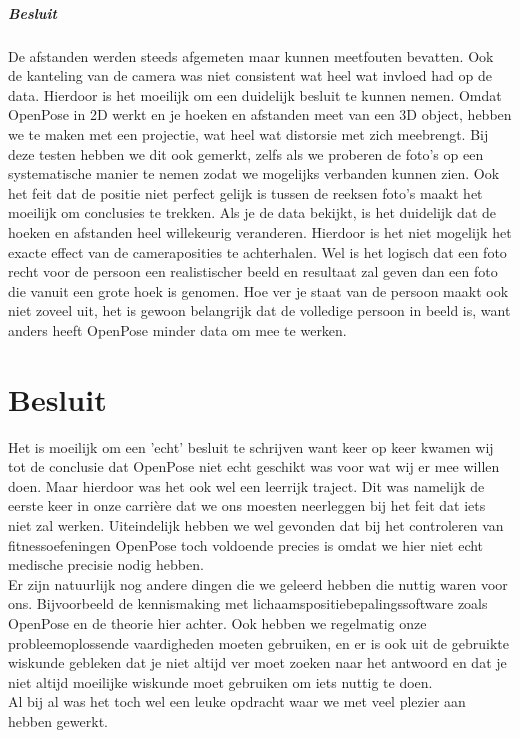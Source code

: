 \documentclass[a4paper,twoside,kulak]{kulakreport}
\begin{document}
\paragraph{Besluit}
De afstanden werden steeds afgemeten maar kunnen meetfouten bevatten. Ook de kanteling van de camera was niet consistent wat heel wat invloed had op de data. Hierdoor is het moeilijk om een duidelijk besluit te kunnen nemen. Omdat OpenPose in 2D werkt en je hoeken en afstanden meet van een 3D object, hebben we te maken met een projectie, wat heel wat distorsie met zich meebrengt. Bij deze testen hebben we dit ook gemerkt, zelfs als we proberen de foto’s op een systematische manier te nemen zodat we mogelijks verbanden kunnen zien. Ook het feit dat de positie niet perfect gelijk is tussen de reeksen foto’s maakt het moeilijk om conclusies te trekken. Als je de data bekijkt, is het duidelijk dat de hoeken en afstanden heel willekeurig veranderen. Hierdoor is het niet mogelijk het exacte effect van de cameraposities te achterhalen. Wel is het logisch dat een foto recht voor de persoon een realistischer beeld en resultaat zal geven dan een foto die vanuit een grote hoek is genomen. Hoe ver je staat van de persoon maakt ook niet zoveel uit, het is gewoon belangrijk dat de volledige persoon in beeld is, want anders heeft OpenPose minder data om mee te werken.

\chapter*{Besluit}
Het is moeilijk om een 'echt' besluit te schrijven want keer op keer kwamen wij tot de conclusie dat OpenPose niet echt geschikt was voor wat wij er mee willen doen. Maar hierdoor was het ook wel een leerrijk traject. Dit was namelijk de eerste keer in onze carrière dat we ons moesten neerleggen bij het feit dat iets niet zal werken. Uiteindelijk hebben we  wel gevonden dat bij het controleren van fitnessoefeningen OpenPose  toch voldoende precies is omdat we hier niet echt medische precisie nodig hebben.\\
Er zijn natuurlijk nog andere dingen die we  geleerd hebben die nuttig waren voor ons. Bijvoorbeeld de kennismaking met lichaamspositiebepalingssoftware zoals OpenPose en de theorie hier achter. Ook hebben we regelmatig onze probleemoplossende vaardigheden moeten gebruiken, en er is ook uit de gebruikte wiskunde gebleken dat je niet altijd ver moet zoeken naar het antwoord en dat je niet altijd moeilijke wiskunde moet gebruiken om iets nuttig te doen.\\
Al bij al was het toch wel een leuke opdracht waar we met veel plezier aan hebben gewerkt.
\end{document}
